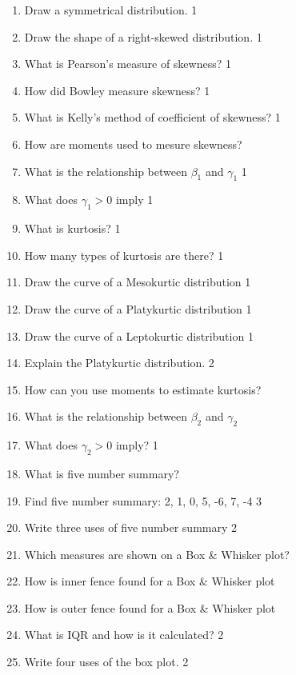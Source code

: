 \documentclass[a4paper,oneside]{book}
\begin{document}
\begin{enumerate}
    \item Draw a symmetrical distribution.   \hfill 1
    \item Draw the shape of a right-skewed distribution.  \hfill 1
    \item What is Pearson's measure of skewness? \hfill 1
    \item How did Bowley measure skewness? \hfill 1
    \item What is Kelly's method of coefficient of skewness? \hfill 1
    \item How are moments used to mesure skewness?
    \item What is the relationship between $\beta_1$ and $\gamma_1$ \hfill 1
    \item What does $\gamma_1>0$ imply \hfill 1
    \item What is kurtosis? \hfill 1
    \item How many types of kurtosis are there? \hfill 1
    \item Draw the curve of a Mesokurtic distribution \hfill 1
    \item Draw the curve of a Platykurtic distribution \hfill 1
    \item Draw the curve of a Leptokurtic distribution \hfill 1
    \item Explain the Platykurtic distribution. \hfill 2
    \item How can you use moments to estimate kurtosis?
    \item What is the relationship between $\beta_2$ and $\gamma_2$
    \item What does $\gamma_2>0$ imply? \hfill 1
    \item What is five number summary?
    \item Find five number summary: 2, 1, 0, 5, -6, 7, -4 \hfill 3
    \item Write three uses of five number summary \hfill 2
    \item Which measures are shown on a Box \& Whisker plot?
    \item How is inner fence found for a Box \& Whisker plot
    \item How is outer fence found for a Box \& Whisker plot
    \item What is IQR and how is it calculated? \hfill 2
    \item Write four uses of the box plot. \hfill 2
    \end{enumerate}
\end{document}
